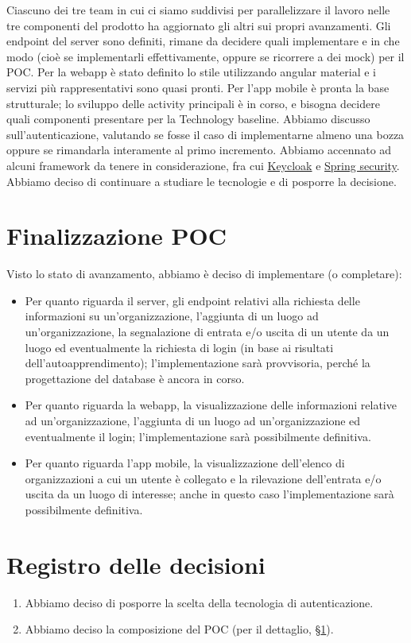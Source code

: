 \documentclass{article}
\begin{document}
Ciascuno dei tre team in cui ci siamo suddivisi per parallelizzare il lavoro nelle tre componenti del prodotto ha aggiornato gli altri sui propri avanzamenti.
Gli endpoint del server sono definiti, rimane da decidere quali implementare e in che modo (cioè se implementarli effettivamente, oppure se ricorrere a dei mock) per il POC\@.
Per la webapp è stato definito lo stile utilizzando angular material e i servizi più rappresentativi sono quasi pronti.
Per l'app mobile è pronta la base strutturale; lo sviluppo delle activity principali è in corso, e bisogna decidere quali componenti presentare per la Technology baseline.
Abbiamo discusso sull'autenticazione, valutando se fosse il caso di implementarne almeno una bozza oppure se rimandarla interamente al primo incremento.
Abbiamo accennato ad alcuni framework da tenere in considerazione, fra cui \href{https://www.keycloak.org/}{Keycloak} e \href{https://spring.io/projects/spring-security}{Spring security}.
Abbiamo deciso di continuare a studiare le tecnologie e di posporre la decisione.

\section{Finalizzazione POC}%
\label{sec:finalizzazione_poc}

Visto lo stato di avanzamento, abbiamo è deciso di implementare (o completare):
\begin{itemize}
  \item Per quanto riguarda il server, gli endpoint relativi alla richiesta delle informazioni su un'organizzazione, l'aggiunta di un luogo ad un'organizzazione, la segnalazione di entrata e/o uscita di un utente da un luogo ed eventualmente la richiesta di login (in base ai risultati dell'autoapprendimento); l'implementazione sarà provvisoria, perché la progettazione del database è ancora in corso.
  \item Per quanto riguarda la webapp, la visualizzazione delle informazioni relative ad un'organizzazione, l'aggiunta di un luogo ad un'organizzazione ed eventualmente il login; l'implementazione sarà possibilmente definitiva.
  \item Per quanto riguarda l'app mobile, la visualizzazione dell'elenco di organizzazioni a cui un utente è collegato e la rilevazione dell'entrata e/o uscita da un luogo di interesse; anche in questo caso l'implementazione sarà possibilmente definitiva.
\end{itemize}

\newpage
\section{Registro delle decisioni}%
\label{sec:registro_delle_decisioni}

\begin{enumerate}
  \item Abbiamo deciso di posporre la scelta della tecnologia di autenticazione.
  \item Abbiamo deciso la composizione del POC (per il dettaglio, §\ref{sec:finalizzazione_poc}).
\end{enumerate}

\end{document}
